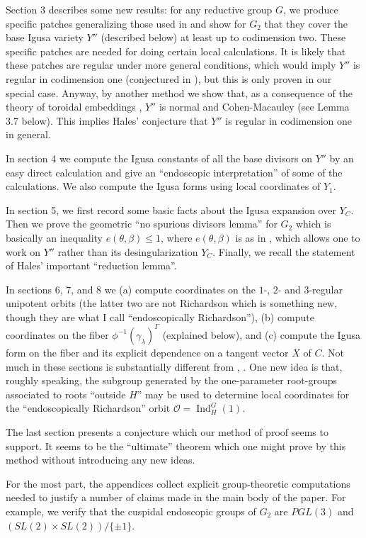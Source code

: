 \documentclass[12pt,letterpaper]{amsart}
\newcommand{\ooo}{\mathcal{O}}
\DeclareMathOperator{\Ind}{Ind}
\begin{document}
Section 3 describes some new results: for any reductive group $G$,
we produce specific patches generalizing those used in \cite{Ha89}
and show for $G_2$
that they cover the base Igusa variety $Y''$ (described below) at least up to
codimension two. These specific patches are needed for doing certain
local calculations.
It is likely that these patches are regular under more
general conditions, which would imply $Y''$ is regular in codimension one
(conjectured in \cite{Ha92a}), but this is only proven in our
special case. Anyway, by another method
we show that, as a consequence of the theory of toroidal embeddings \cite{Ke72},
$Y''$ is normal and Cohen-Macauley (see Lemma 3.7 below).
This implies Hales' conjecture that
$Y''$ is regular in codimension one in general.

In section 4 we compute the Igusa constants of all
the base divisors on $Y''$ by an easy direct calculation
and give an ``endoscopic interpretation'' of some of the
calculations.
We also compute the Igusa forms using local coordinates of $Y_1$.

In section 5, we first record some basic facts about
the Igusa expansion over $Y_C$. Then we
prove the geometric ``no spurious divisors lemma'' for $G_2$
which is basically an inequality $e(\theta,\beta)\leq 1$,
where $e(\theta,\beta)$ is as in \cite{La83}, which allows one to work
on $Y''$ rather than its desingularization $Y_C$.
Finally, we recall the statement of Hales' important ``reduction lemma''.

In sections 6, 7, and 8
we (a) compute coordinates
on the $1$-, $2$- and $3$-regular unipotent orbits (the latter two
are not Richardson which is something new, though they are what I call
``endoscopically Richardson''), (b) compute
coordinates on the fiber $\phi^{-1}(\gamma_\lambda)^\Gamma$
(explained below), and (c) compute the Igusa form
on the fiber and its explicit dependence on a tangent vector $X$
of $C$. Not much in these
sections is substantially different from \cite{Ha89}, \cite{Ha92b}. One
new idea is that, roughly speaking, the subgroup generated by the
one-parameter root-groups associated to roots ``outside $H$''
may be used to determine local coordinates for the
``endoscopically Richardson'' orbit $\ooo=\Ind_H^G(1)$.

The last section presents a conjecture which our method of proof
seems to support. It seems to be the ``ultimate'' theorem which one
might prove by this method without introducing any new ideas.

For the most part, the appendices collect explicit
group-theoretic computations
needed to justify a number of claims made in the main body of the paper.
For example, we verify that the cuspidal endoscopic groups of $G_2$ are
$PGL(3)$ and $(SL(2)\times SL(2))/\{\pm 1\}$.
\end{document}
